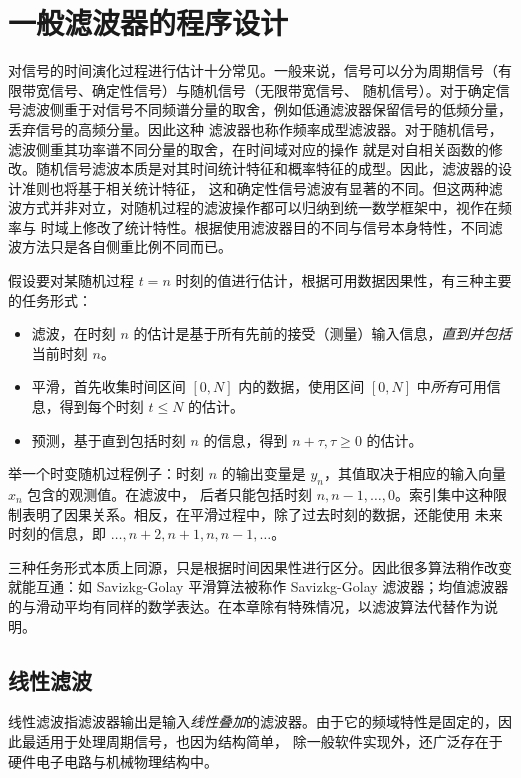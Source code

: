 \chapter[short]{一般滤波器的程序设计}

对信号的时间演化过程进行估计十分常见。一般来说，信号可以分为周期信号（有限带宽信号、确定性信号）与随机信号（无限带宽信号、
随机信号）。对于确定信号滤波侧重于对信号不同频谱分量的取舍，例如低通滤波器保留信号的低频分量，丢弃信号的高频分量。因此这种
滤波器也称作频率成型滤波器\cite{oppenheim1997signals}。对于随机信号，滤波侧重其功率谱不同分量的取舍，在时间域对应的操作
就是对自相关函数的修改。随机信号滤波本质是对其时间统计特征和概率特征的成型。因此，滤波器的设计准则也将基于相关统计特征，
这和确定性信号滤波有显著的不同。但这两种滤波方式并非对立，对随机过程的滤波操作都可以归纳到统一数学框架中，视作在频率与
时域上修改了统计特性。根据使用滤波器目的不同与信号本身特性，不同滤波方法只是各自侧重比例不同而已。

假设要对某随机过程 $t=n$ 时刻的值进行估计，根据可用数据因果性，有三种主要的任务形式\cite{theodoridis2020machine}：
\begin{itemize}
    \item  滤波，在时刻 $n$ 的估计是基于所有先前的接受（测量）输入信息，\emph{直到并包括}当前时刻 $n$。
    \item  平滑，首先收集时间区间 $[0,N]$ 内的数据，使用区间 $[0,N]$ 中\emph{所有}可用信息，得到每个时刻 $t\le N$ 的估计。
    \item  预测，基于直到包括时刻 $n$ 的信息，得到 $n+ \tau,\tau\ge 0$ 的估计。
\end{itemize}

举一个时变随机过程例子：时刻 $n$ 的输出变量是 $y_n$，其值取决于相应的输入向量 $x_n$ 包含的观测值。在滤波中，
后者只能包括时刻 $n,n-1,\dots ,0$。索引集中这种限制表明了因果关系。相反，在平滑过程中，除了过去时刻的数据，还能使用
未来时刻的信息，即 $\dots ,n+2,n+1,n,n-1,\dots $。

三种任务形式本质上同源，只是根据时间因果性进行区分。因此很多算法稍作改变就能互通：如 Savizkg-Golay 平滑算法被称作
Savizkg-Golay 滤波器；均值滤波器的与滑动平均有同样的数学表达。在本章除有特殊情况，以滤波算法代替作为说明。

\section{线性滤波}

线性滤波指滤波器输出是输入\emph{线性叠加}的滤波器。由于它的频域特性是固定的，因此最适用于处理周期信号，也因为结构简单，
除一般软件实现外，还广泛存在于硬件电子电路与机械物理结构中。

